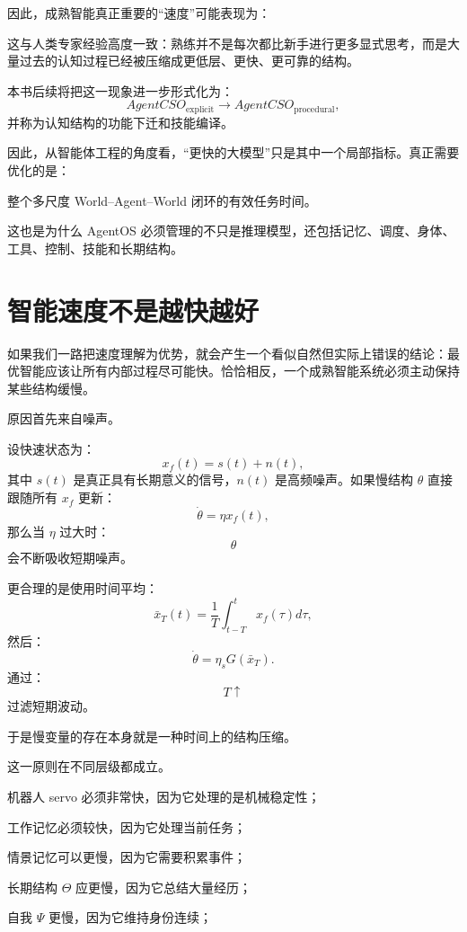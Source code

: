 因此，成熟智能真正重要的“速度”可能表现为：
\begin{statementbox}
\centering
{}
\end{statementbox}

这与人类专家经验高度一致：熟练并不是每次都比新手进行更多显式思考，而是大量过去的认知过程已经被压缩成更低层、更快、更可靠的结构。

本书后续将把这一现象进一步形式化为：
\[
AgentCSO_{\mathrm{explicit}}
\rightarrow
AgentCSO_{\mathrm{procedural}},
\]
并称为认知结构的功能下迁和技能编译。

因此，从智能体工程的角度看，“更快的大模型”只是其中一个局部指标。真正需要优化的是：
\begin{statementbox}
整个多尺度 World--Agent--World 闭环的有效任务时间。
\end{statementbox}
这也是为什么 AgentOS 必须管理的不只是推理模型，还包括记忆、调度、身体、工具、控制、技能和长期结构。

\section{智能速度不是越快越好}

如果我们一路把速度理解为优势，就会产生一个看似自然但实际上错误的结论：最优智能应该让所有内部过程尽可能快。恰恰相反，一个成熟智能系统必须主动保持某些结构缓慢。

原因首先来自噪声。

设快速状态为：
\[
x_f(t)
=
s(t)
+
n(t),
\]
其中 $s(t)$ 是真正具有长期意义的信号，$n(t)$ 是高频噪声。如果慢结构 $\theta$ 直接跟随所有 $x_f$ 更新：
\[
\dot\theta
=
\eta x_f(t),
\]
那么当 $\eta$ 过大时：
\[
\theta
\]
会不断吸收短期噪声。

更合理的是使用时间平均：
\[
\bar x_T(t)
=
\frac1T
\int_{t-T}^{t}
x_f(\tau)d\tau,
\]
然后：
\[
\dot\theta
=
\eta_s
G(\bar x_T).
\]
通过：
\[
T\uparrow
\]
过滤短期波动。

于是慢变量的存在本身就是一种时间上的结构压缩。

这一原则在不同层级都成立。

机器人 servo 必须非常快，因为它处理的是机械稳定性；

工作记忆必须较快，因为它处理当前任务；

情景记忆可以更慢，因为它需要积累事件；

长期结构 $\Theta$ 应更慢，因为它总结大量经历；

自我 $\Psi$ 更慢，因为它维持身份连续；

